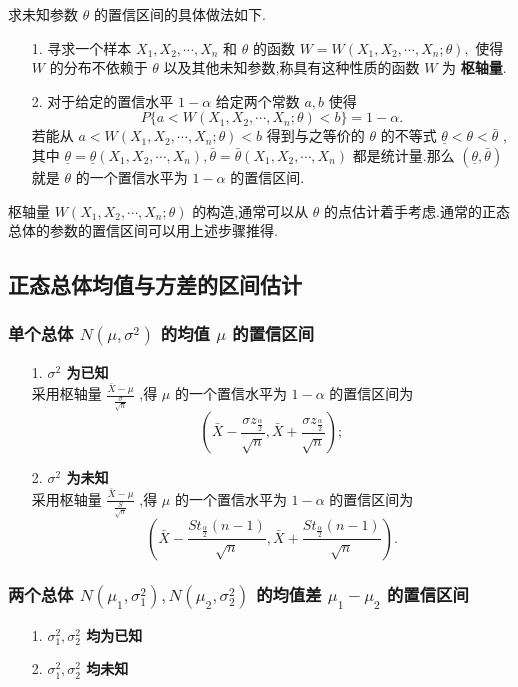 \documentclass[UTF8,10pt]{ctexart}
\begin{document}
	求未知参数 $ \theta $ 的置信区间的具体做法如下.
	\begin{enumerate}
		\item [1.] 寻求一个样本 $ X_{1},X_{2}, \cdots ,X_{n} $ 和 $ \theta $ 的函数 $ W=W(X_{1},X_{2}, \cdots ,X_{n}; \theta ), $ 使得 $ W $ 的分布不依赖于 $ \theta $ 以及其他未知参数,称具有这种性质的函数 $ W $ 为 \textbf{枢轴量}.
		\item [2.] 对于给定的置信水平 $ 1- \alpha $ 给定两个常数 $ a,b $ 使得 $$ P\{a<W(X_{1},X_{2}, \cdots ,X_{n}; \theta )<b\}=1- \alpha . $$ 若能从 $ a<W(X_{1},X_{2}, \cdots ,X_{n}; \theta )<b $ 得到与之等价的 $ \theta $ 的不等式 $ \underline{ \theta }< \theta < \bar{ \theta } $ ,其中 $ \underline{ \theta } = \underline{ \theta }(X_{1},X_{2}, \cdots ,X_{n}), \bar{ \theta }= \bar{ \theta }(X_{1},X_{2}, \cdots ,X_{n}) $ 都是统计量.那么 $ (\underline{ \theta } , \bar{ \theta } ) $ 就是 $ \theta $ 的一个置信水平为 $ 1- \alpha $ 的置信区间.
	\end{enumerate}

	枢轴量 $ W(X_{1},X_{2}, \cdots ,X_{n}; \theta ) $ 的构造,通常可以从 $ \theta $ 的点估计着手考虑.通常的正态总体的参数的置信区间可以用上述步骤推得.
	
	\subsection{正态总体均值与方差的区间估计}
	
	\subsubsection{单个总体 $ N( \mu , \sigma ^{2} ) $ 的均值 $ \mu $ 的置信区间}
	
	\begin{enumerate}
		\item [1.] \textbf{$ \sigma ^{2} $ 为已知} \\ 采用枢轴量 $ \frac{ \bar{X} - \mu }{ \frac{ \sigma }{ \sqrt{n} } } $ ,得 $ \mu $ 的一个置信水平为 $ 1- \alpha $ 的置信区间为 $$ ( \bar{X} - \frac{ \sigma z_{ \frac{ \alpha }{2} } }{ \sqrt{n} }, \bar{X} + \frac{ \sigma z_{ \frac{ \alpha }{2} } }{ \sqrt{n} }); $$
		\item [2.] \textbf{$ \sigma ^{2} $ 为未知} \\ 采用枢轴量 $ \frac{ \bar{X} - \mu }{ \frac{ S }{ \sqrt{n} } } $ ,得 $ \mu $ 的一个置信水平为 $ 1- \alpha $ 的置信区间为 $$ ( \bar{X} - \frac{S t_{ \frac{ \alpha }{2} } (n-1)}{ \sqrt{n} } , \bar{X} + \frac{S t_{ \frac{ \alpha }{2} } (n-1)}{ \sqrt{n} } ). $$
	\end{enumerate}

	\subsubsection{两个总体 $ N( \mu _{1} , \sigma _{1}^{2} ), N( \mu _{2} , \sigma _{2}^{2} ) $ 的均值差 $ \mu _{1} - \mu _{2} $ 的置信区间}
	
	\begin{enumerate}
		\item [1.] \textbf{$ \sigma _{1}^{2}, \sigma _{2}^{2} $ 均为已知}
		\item [2.] \textbf{$ \sigma _{1}^{2}, \sigma _{2}^{2} $ 均未知} 
	\end{enumerate}
	
\end{document}
